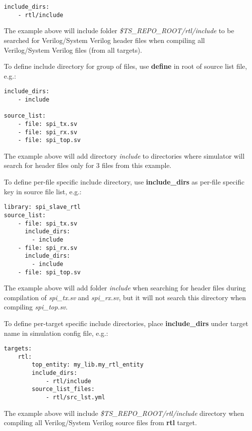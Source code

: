 \documentclass{tropic_design_spec}
\begin{document}
\begin{lstlisting}
include_dirs:
    - rtl/include
\end{lstlisting}

The example above will include folder \textit{\$TS_REPO_ROOT/rtl/include} to be searched
for Verilog/System Verilog header files when compiling all Verilog/System Verilog files
(from all targets).

To define include directory for group of files, use \textbf{define} in root of source
list file, e.g.:

\begin{lstlisting}
include_dirs:
    - include

source_list:
    - file: spi_tx.sv
    - file: spi_rx.sv
    - file: spi_top.sv
\end{lstlisting}

The example above will add directory \textit{include} to directories where simulator
will search for header files only for 3 files from this example.

To define per-file specific include directory, use \textbf{include_dirs} as per-file
specific key in source file list, e.g.:

\begin{lstlisting}
library: spi_slave_rtl
source_list:
    - file: spi_tx.sv
      include_dirs:
        - include
    - file: spi_rx.sv
      include_dirs:
        - include
    - file: spi_top.sv
\end{lstlisting}

The example above will add folder \textit{include} when searching for header files
during compilation of \textit{spi_tx.sv} and \textit{spi_rx.sv}, but it will not
search this directory when compiling \textit{spi_top.sv}.


To define per-target specific include directories, place \textbf{include_dirs} under
target name in simulation config file, e.g.:

\begin{lstlisting}
targets:
    rtl:
        top_entity: my_lib.my_rtl_entity
        include_dirs:
            - rtl/include
        source_list_files:
            - rtl/src_lst.yml
\end{lstlisting}

The example above will include \textit{\$TS_REPO_ROOT/rtl/include} directory when
compiling all Verilog/System Verilog source files from \textbf{rtl} target.
\end{document}
